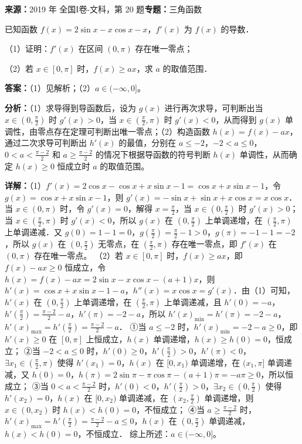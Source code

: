 \begin{question}[points=12]
\textbf{来源：}2019 年 全国I卷-文科，第 20 题\quad \textbf{专题：}三角函数\par
已知函数 $f(x) = 2\sin x - x\cos x - x$，$f'(x)$ 为 $f(x)$ 的导数．

（1）证明：$f'(x)$ 在区间 $(0,\pi)$ 存在唯一零点；

（2）若 $x \in [0,\pi]$ 时，$f(x) \ge ax$，求 $a$ 的取值范围．
\begin{solution}
\textbf{答案：}（1）见解析；（2）$a \in (-\infty, 0]$。

\textbf{分析：}（1）求导得到导函数后，设为 $g(x)$ 进行再次求导，可判断出当 $x \in (0,\frac{\pi}{2})$ 时 $g'(x)>0$，当 $x \in (\frac{\pi}{2},\pi)$ 时 $g'(x)<0$，从而得到 $g(x)$ 单调性，由零点存在定理可判断出唯一零点；（2）构造函数 $h(x)=f(x)-ax$，通过二次求导可判断出 $h'(x)$ 的最值，分别在 $a \le -2$，$-2<a\le0$，$0<a<\frac{\pi-2}{2}$ 和 $a \ge \frac{\pi-2}{2}$ 的情况下根据导函数的符号判断 $h(x)$ 单调性，从而确定 $h(x)\ge0$ 恒成立时 $a$ 的取值范围。

\textbf{详解：}（1）$f'(x)=2\cos x - \cos x + x\sin x -1 = \cos x + x\sin x -1$，令 $g(x)=\cos x + x\sin x -1$，则 $g'(x)=-\sin x + \sin x + x\cos x = x\cos x$．当 $x \in (0,\pi)$ 时，令 $g'(x)=0$，解得 $x=\frac{\pi}{2}$，当 $x\in(0,\frac{\pi}{2})$ 时 $g'(x)>0$；当 $x\in(\frac{\pi}{2},\pi)$ 时 $g'(x)<0$，所以 $g(x)$ 在 $(0,\frac{\pi}{2})$ 上单调递增，在 $(\frac{\pi}{2},\pi)$ 上单调递减．又 $g(0)=1-1=0$，$g(\frac{\pi}{2})=\frac{\pi}{2}-1>0$，$g(\pi)=-1-1=-2$，所以 $g(x)$ 在 $(0,\frac{\pi}{2})$ 无零点，在 $(\frac{\pi}{2},\pi)$ 存在唯一零点，即 $f'(x)$ 在 $(0,\pi)$ 存在唯一零点。
（2）若 $x\in[0,\pi]$ 时，$f(x)\ge ax$，即 $f(x)-ax\ge0$ 恒成立，令 $h(x)=f(x)-ax=2\sin x - x\cos x - (a+1)x$，则 $h'(x)=\cos x + x\sin x -1 - a$，$h''(x)=x\cos x = g'(x)$．由（1）可知，$h'(x)$ 在 $(0,\frac{\pi}{2})$ 上单调递增，在 $(\frac{\pi}{2},\pi)$ 上单调递减，且 $h'(0)=-a$，$h'(\frac{\pi}{2})=\frac{\pi-2}{2}-a$，$h'(\pi)=-2-a$，所以 $h'(x)_{\min}=h'(\pi)=-2-a$，$h'(x)_{\max}=h'(\frac{\pi}{2})=\frac{\pi-2}{2}-a$．
①当 $a\le -2$ 时，$h'(x)_{\min}=-2-a\ge0$，即 $h'(x)\ge0$ 在 $[0,\pi]$ 上恒成立，$h(x)$ 单调递增，$h(x)\ge h(0)=0$，恒成立；
②当 $-2<a\le0$ 时，$h'(0)\ge0$，$h'(\frac{\pi}{2})>0$，$h'(\pi)<0$，$\exists x_1\in(\frac{\pi}{2},\pi)$ 使得 $h'(x_1)=0$，$h(x)$ 在 $[0,x_1)$ 单调递增，在 $(x_1,\pi]$ 单调递减，又 $h(0)=0$，$h(\pi)=2\sin \pi - \pi\cos \pi - (a+1)\pi = -a\pi \ge 0$，所以恒成立；
③当 $0<a<\frac{\pi-2}{2}$ 时，$h'(0)<0$，$h'(\frac{\pi}{2})>0$，$\exists x_2\in(0,\frac{\pi}{2})$ 使得 $h'(x_2)=0$，$h(x)$ 在 $[0,x_2)$ 单调递减，在 $(x_2,\frac{\pi}{2})$ 单调递增，则 $x\in(0,x_2)$ 时 $h(x)<h(0)=0$，不恒成立；
④当 $a\ge \frac{\pi-2}{2}$ 时，$h'(x)_{\max}=h'(\frac{\pi}{2})=\frac{\pi-2}{2}-a\le0$，$h(x)$ 在 $(0,\frac{\pi}{2})$ 单调递减，$h(x)<h(0)=0$，不恒成立．
综上所述：$a\in(-\infty,0]$。
\end{solution}
\end{question}

